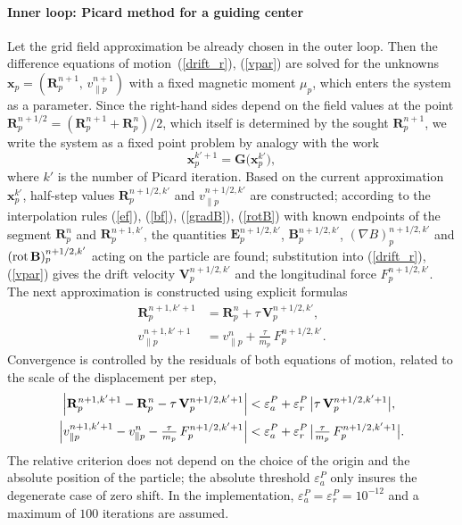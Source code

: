 \documentclass[final,3p]{elsarticle}
\newcommand{\rot}{\mbox{\rm{rot\,}}}
\begin{document}
\paragraph{Inner loop: Picard method for a guiding center}
Let the grid field approximation be already chosen in the outer loop. Then the difference equations of motion~(\ref{drift_r}), (\ref{vpar}) are solved for the unknowns $\mathbf{x}_p=(\mathbf{R}_p^{n+1},\,v_{\|p}^{n+1})$ with a fixed magnetic moment $\mu_p$, which enters the system as a parameter. Since the right-hand sides depend on the field values at the point $\mathbf{R}_p^{n+1/2}=(\mathbf{R}_p^{n+1}+\mathbf{R}_p^n)/2$, which itself is determined by the sought $\mathbf{R}_p^{n+1}$, we write the system as a fixed point problem by analogy with the work~\cite{Chen2023}
\begin{equation}\label{pic_fp}
    \mathbf{x}_p^{k'+1}=\mathbf{G}\bigl(\mathbf{x}_p^{k'}\bigr),
\end{equation}
where $k'$ is the number of Picard iteration. Based on the current approximation $\mathbf{x}_p^{k'}$, half-step values $\mathbf{R}_p^{n+1/2,k'}$ and $v_{\|p}^{n+1/2,k'}$ are constructed; according to the interpolation rules (\ref{ef}), (\ref{bf}), (\ref{gradB}), (\ref{rotB}) with known endpoints of the segment $\mathbf{R}_p^n$ and $\mathbf{R}_p^{n+1,k'}$, the quantities $\mathbf{E}_p^{n+1/2,k'}$, $\mathbf{B}_p^{n+1/2,k'}$, $(\nabla B)_p^{n+1/2,k'}$ and $(\rot\mathbf{B})_p^{n+1/2,k'}$ acting on the particle are found; substitution into (\ref{drift_r}), (\ref{vpar}) gives the drift velocity $\mathbf{V}_p^{n+1/2,k'}$ and the longitudinal force $F_p^{n+1/2,k'}$. The next approximation is constructed using explicit formulas
\begin{align}
    \mathbf{R}_p^{n+1,k'+1} &= \mathbf{R}_p^n + \tau\,\mathbf{V}_p^{n+1/2,k'}, \label{pic_R}\\
    v_{\|p}^{n+1,k'+1}      &= v_{\|p}^n + \frac{\tau}{m_p}\,F_p^{n+1/2,k'}. \label{pic_v}
\end{align}
Convergence is controlled by the residuals of both equations of motion, related to the scale of the displacement per step,
\begin{align}
    \Bigl|\mathbf{R}_p^{n+1,k'+1}-\mathbf{R}_p^n-\tau\,\mathbf{V}_p^{n+1/2,k'+1}\Bigr|
        &< \varepsilon_a^{P} + \varepsilon_r^{P}\,\bigl|\tau\,\mathbf{V}_p^{n+1/2,k'+1}\bigr|, \label{pic_eR}\\
    \Bigl|v_{\|p}^{n+1,k'+1}-v_{\|p}^n-\tfrac{\tau}{m_p}\,F_p^{n+1/2,k'+1}\Bigr|
        &< \varepsilon_a^{P} + \varepsilon_r^{P}\,\bigl|\tfrac{\tau}{m_p}\,F_p^{n+1/2,k'+1}\bigr|. \label{pic_ev}
\end{align}
The relative criterion does not depend on the choice of the origin and the absolute position of the particle; the absolute threshold $\varepsilon_a^{P}$ only insures the degenerate case of zero shift. In the implementation, $\varepsilon_a^{P}=\varepsilon_r^{P}=10^{-12}$ and a maximum of $100$ iterations are assumed. 
\end{document}
